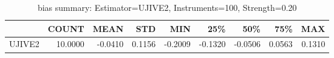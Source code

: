 \begin{table}[ht]
\centering
\caption{bias summary: Estimator=UJIVE2, Instruments=100, Strength=0.20}
\begin{tabular}{lrrrrrrrr}
\toprule
 & COUNT & MEAN & STD & MIN & 25\% & 50\% & 75\% & MAX \\
\midrule
UJIVE2 & 10.0000 & -0.0410 & 0.1156 & -0.2009 & -0.1320 & -0.0506 & 0.0563 & 0.1310 \\
\bottomrule
\end{tabular}
\end{table}
